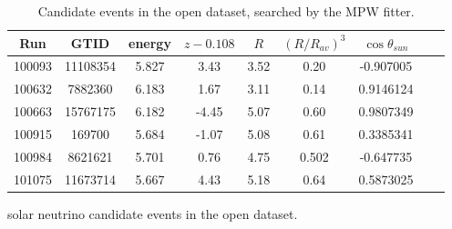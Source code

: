 \begin{table}[ht]
	\centering
	\caption{Candidate events in the open dataset, searched by the MPW fitter.}
	\label{opendataMPW}
	\begin{tabular*}{150mm}{c@{\extracolsep{\fill}}cccccccc}
		\toprule
		Run & GTID & energy & $z-0.108$ & $R$ & $(R/R_{av})^3$ & $\cos\theta_{sun}$\\
		\hline 
		100093 &	11108354	&5.827 & 3.43 & 3.52 & 0.20 & -0.907005\\
		100632&	7882360    &6.183& 1.67 &3.11 &0.14 &0.9146124\\
		100663&	15767175   &	6.182 & -4.45 &5.07 &0.60&	0.9807349\\
		100915&	169700   &	5.684 &	-1.07 &5.08 &0.61&0.3385341\\
		100984&	8621621&	5.701 & 0.76 &4.75 &0.502&-0.647735\\
		101075&	11673714&	5.667 &4.43 &5.18 &0.64& 0.5873025\\
		
		\bottomrule
	\end{tabular*}
\end{table}
solar neutrino candidate events in the open dataset.

